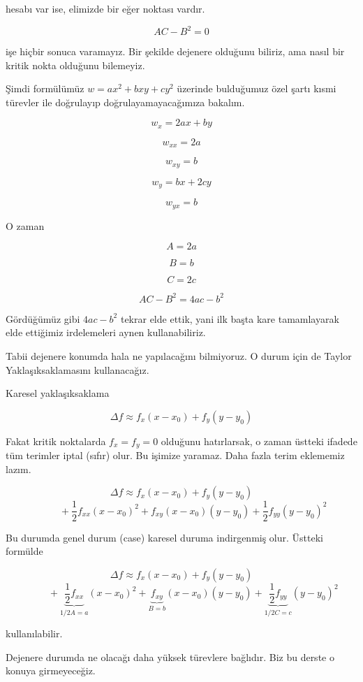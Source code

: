 \documentclass[12pt,fleqn]{article}\usepackage{../../common}
\begin{document}
hesabı var ise, elimizde bir eğer noktası vardır. 

$$ AC - B^2 = 0 $$

işe hiçbir sonuca varamayız. Bir şekilde dejenere olduğunu biliriz, ama
nasıl bir kritik nokta olduğunu bilemeyiz. 

Şimdi formülümüz $w = ax^2 + bxy + cy^2$ üzerinde bulduğumuz özel şartı
kısmi türevler ile doğrulayıp doğrulayamayacağımıza bakalım. 

$$ w_{x} = 2ax + by$$

$$ w_{xx} = 2a$$

$$ w_{xy} = b$$

$$ w_{y} = bx + 2cy $$

$$ w_{yx} = b $$

O zaman

$$ A = 2a $$

$$ B = b $$

$$ C = 2c $$

$$ AC - B^2 = 4ac - b^2 $$

Gördüğümüz gibi $4ac - b^2$ tekrar elde ettik, yani ilk başta kare
tamamlayarak elde ettiğimiz irdelemeleri aynen kullanabiliriz. 

Tabii dejenere konumda hala ne yapılacağını bilmiyoruz. O durum için de
Taylor Yaklaşıksaklamasını kullanacağız. 

Karesel yaklaşıksaklama

$$ \Delta f \approx f_x (x - x_0) + f_y (y - y_0) $$

Fakat kritik noktalarda $f_x = f_y = 0$ olduğunu hatırlarsak, o zaman
üstteki ifadede tüm terimler iptal (sıfır) olur. Bu işimize yaramaz. Daha
fazla terim eklememiz lazım. 

$$ \Delta f \approx f_x (x - x_0) + f_y (y - y_0)   $$
$$\hspace{1cm}  + 
\frac{1}{2}f_{xx}(x-x_0)^2 + f_{xy}(x-x_0)(y-y_0) + 
\frac{1}{2}f_{yy}(y-y_0)^2 $$

Bu durumda genel durum (case) karesel duruma indirgenmiş olur. Üstteki
formülde 

$$ \Delta f \approx f_x (x - x_0) + f_y (y - y_0)   $$
$$\hspace{1cm} + 
\underbrace{\frac{1}{2}f_{xx}}_{1/2 A = a}(x-x_0)^2 + 
\underbrace{f_{xy}}_{B=b}(x-x_0)(y-y_0) + 
\underbrace{\frac{1}{2}f_{yy}}_{1/2 C = c}(y-y_0)^2 $$

kullanılabilir. 

Dejenere durumda ne olacağı daha yüksek türevlere bağlıdır. Biz bu derste o
konuya girmeyeceğiz. 
\end{document}
